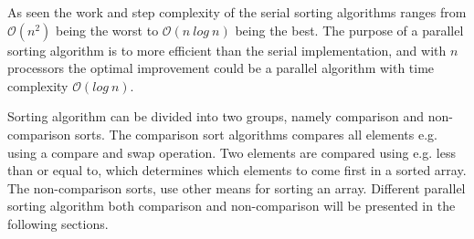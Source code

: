 As seen the work and step complexity of the serial sorting algorithms ranges from $\mathcal{O}(n^2)$ being the worst to $\mathcal{O}(n~log~n)$ being the best. The purpose of a parallel sorting algorithm is to more efficient than the serial implementation, and with $n$ processors the optimal improvement could be a parallel algorithm with time complexity $\mathcal{O}(log~n)$.

Sorting algorithm can be divided into two groups, namely comparison and non-comparison sorts. The comparison sort algorithms compares all elements e.g. using a compare and swap operation. Two elements are compared using e.g. less than or equal to, which determines which elements to come first in a sorted array. The non-comparison sorts, use other means for sorting an array. Different parallel sorting algorithm both comparison and non-comparison will be presented in the following sections. 